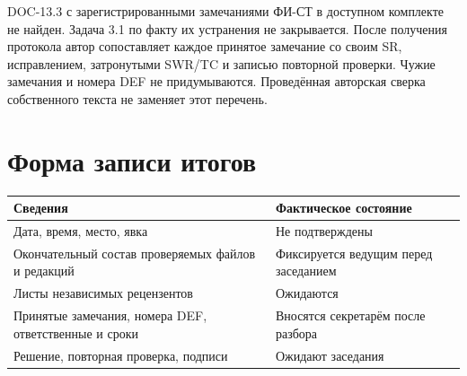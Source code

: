 \documentclass[12pt,a4paper]{article}
\newcounter{none} %
\begin{document}
\hypertarget{задача-31-и-замечания-фи-ст}{}

DOC-13.3 с зарегистрированными замечаниями ФИ-СТ в доступном комплекте не найден. Задача 3.1 по факту их устранения не закрывается. После получения протокола автор сопоставляет каждое принятое замечание со своим SR, исправлением, затронутыми SWR/TC и записью повторной проверки. Чужие замечания и номера DEF не придумываются. Проведённая авторская сверка собственного текста не заменяет этот перечень.

\section{Форма записи итогов}\label{ux444ux43eux440ux43cux430-ux437ux430ux43fux438ux441ux438-ux438ux442ux43eux433ux43eux432}

\hypertarget{форма-записи-итогов}{}

{\def\LTcaptype{none} %
\begin{longtable}[]{@{}
  >{\raggedright\arraybackslash}p{}
  >{\raggedright\arraybackslash}p{}@{}}
\toprule\noalign{}
\begin{minipage}[b]{\linewidth}\raggedright
Сведения
\end{minipage} & \begin{minipage}[b]{\linewidth}\raggedright
Фактическое состояние
\end{minipage} \\
\midrule\noalign{}
\endhead
\bottomrule\noalign{}
\endlastfoot
Дата, время, место, явка & Не подтверждены \\
Окончательный состав проверяемых файлов и редакций & Фиксируется ведущим перед заседанием \\
Листы независимых рецензентов & Ожидаются \\
Принятые замечания, номера DEF, ответственные и сроки & Вносятся секретарём после разбора \\
Решение, повторная проверка, подписи & Ожидают заседания \\
\end{longtable}
}
\end{document}

